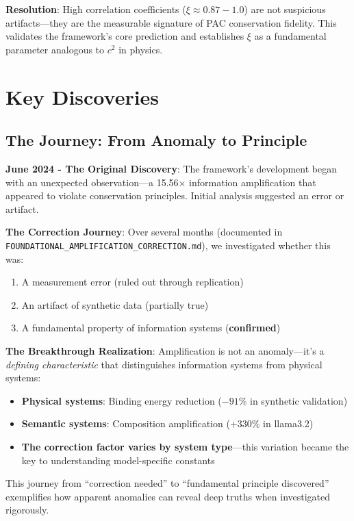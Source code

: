 \documentclass[11pt,a4paper]{article}
\begin{document}
\textbf{Resolution}: High correlation coefficients ($\xi \approx 0.87-1.0$) are not suspicious artifacts---they are the measurable signature of PAC conservation fidelity. This validates the framework's core prediction and establishes $\xi$ as a fundamental parameter analogous to $c^2$ in physics.

\section{Key Discoveries}

\subsection{The Journey: From Anomaly to Principle}

\textbf{June 2024 - The Original Discovery}: The framework's development began with an unexpected observation---a 15.56$\times$ information amplification that appeared to violate conservation principles. Initial analysis suggested an error or artifact.

\textbf{The Correction Journey}: Over several months (documented in \texttt{FOUNDATIONAL\_AMPLIFICATION\_CORRECTION.md}), we investigated whether this was:
\begin{enumerate}
    \item A measurement error (ruled out through replication)
    \item An artifact of synthetic data (partially true)
    \item A fundamental property of information systems (\textbf{confirmed})
\end{enumerate}

\textbf{The Breakthrough Realization}: Amplification is not an anomaly---it's a \emph{defining characteristic} that distinguishes information systems from physical systems:

\begin{itemize}
    \item \textbf{Physical systems}: Binding energy reduction ($-91\%$ in synthetic validation)
    \item \textbf{Semantic systems}: Composition amplification ($+330\%$ in llama3.2)
    \item \textbf{The correction factor varies by system type}---this variation became the key to understanding model-specific constants
\end{itemize}

This journey from ``correction needed'' to ``fundamental principle discovered'' exemplifies how apparent anomalies can reveal deep truths when investigated rigorously.
\end{document}
